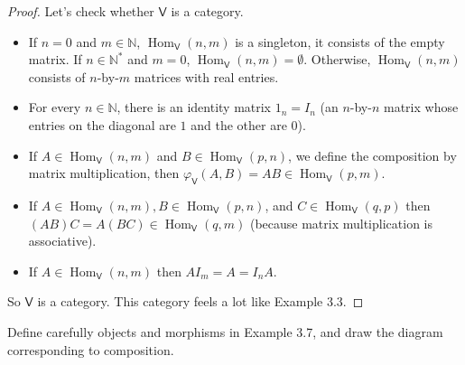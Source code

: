 \begin{proof}
	Let's check whether $\mathsf{V}$ is a category.
	\begin{itemize}
		\item If $n = 0$ and $m\in\mathbb{N}$, $\operatorname{Hom}_{\mathsf{V}}(n, m)$ is a singleton, it consists of the empty matrix. If $n\in\mathbb{N}^{*}$ and $m = 0$, $\operatorname{Hom}_{\mathsf{V}}(n, m) = \emptyset$. Otherwise, $\operatorname{Hom}_{\mathsf{V}}(n, m)$ consists of $n$-by-$m$ matrices with real entries.
		\item For every $n\in\mathbb{N}$, there is an identity matrix $1_{n} = I_{n}$ (an $n$-by-$n$ matrix whose entries on the diagonal are $1$ and the other are $0$).
		\item If $A\in \operatorname{Hom}_{\mathsf{V}}(n, m)$ and $B\in \operatorname{Hom}_{\mathsf{V}}(p, n)$, we define the composition by matrix multiplication, then $\varphi_{\mathsf{V}}(A, B) = AB \in \operatorname{Hom}_{\mathsf{V}}(p, m)$.
		\item If $A\in \operatorname{Hom}_{\mathsf{V}}(n, m), B\in \operatorname{Hom}_{\mathsf{V}}(p, n)$, and $C\in \operatorname{Hom}_{\mathsf{V}}(q, p)$ then $(AB)C = A(BC) \in \operatorname{Hom}_{\mathsf{V}}(q, m)$ (because matrix multiplication is associative).
		\item If $A\in \operatorname{Hom}_{\mathsf{V}}(n, m)$ then $AI_{m} = A = I_{n}A$.
	\end{itemize}

	So $\mathsf{V}$ is a category. This category feels a lot like Example 3.3.
\end{proof}

\begin{exercise}{3.7}
	Define carefully objects and morphisms in Example 3.7, and draw the diagram corresponding to composition.
\end{exercise}

